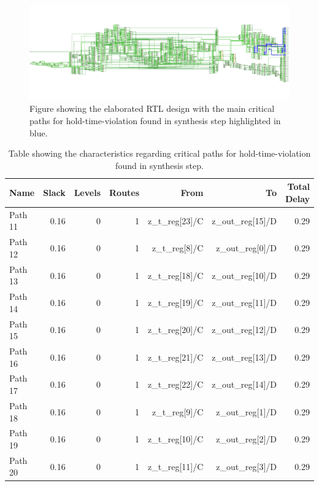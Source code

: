 \begin{figure}[H]
    \centering
    \includegraphics[width=\textwidth]{./images/Vivado/hold_synthesis.pdf}
    \caption{Figure showing the elaborated RTL design with the main critical paths for hold-time-violation found in synthesis step highlighted in blue.}
    \label{fig:hold_synthesis}
\end{figure}  

\begin{table}[H]
    \centering
    \small
    \captionsetup{skip=10pt} 
    \begin{tabular}{lrrrrrr}
        \hline
        Name    & Slack & Levels & Routes  & From           & To               & Total Delay \\
        \hline
        Path 11 & 0.16  & 0      & 1       & z\_t\_reg[23]/C & z\_out\_reg[15]/D & 0.29       \\
        Path 12 & 0.16  & 0      & 1       & z\_t\_reg[8]/C  & z\_out\_reg[0]/D  & 0.29       \\
        Path 13 & 0.16  & 0      & 1       & z\_t\_reg[18]/C & z\_out\_reg[10]/D & 0.29       \\
        Path 14 & 0.16  & 0      & 1       & z\_t\_reg[19]/C & z\_out\_reg[11]/D & 0.29       \\
        Path 15 & 0.16  & 0      & 1       & z\_t\_reg[20]/C & z\_out\_reg[12]/D & 0.29       \\
        Path 16 & 0.16  & 0      & 1       & z\_t\_reg[21]/C & z\_out\_reg[13]/D & 0.29       \\
        Path 17 & 0.16  & 0      & 1       & z\_t\_reg[22]/C & z\_out\_reg[14]/D & 0.29       \\
        Path 18 & 0.16  & 0      & 1       & z\_t\_reg[9]/C  & z\_out\_reg[1]/D  & 0.29       \\
        Path 19 & 0.16  & 0      & 1       & z\_t\_reg[10]/C & z\_out\_reg[2]/D  & 0.29       \\
        Path 20 & 0.16  & 0      & 1       & z\_t\_reg[11]/C & z\_out\_reg[3]/D  & 0.29       \\
        \hline
    \end{tabular}
    \caption{Table showing the characteristics regarding critical paths for hold-time-violation found in synthesis step.}
    \label{tab:hold_synthesis}
\end{table}


